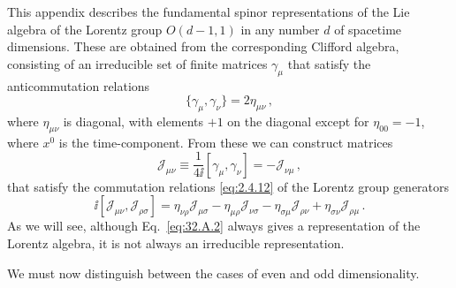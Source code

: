 

This appendix describes the fundamental spinor representations of the Lie
algebra of the Lorentz group \(O(d-1,1)\) in any number \(d\) of spacetime
dimensions. These are obtained from the corresponding Clifford algebra,
consisting of an irreducible set of finite matrices \(\gamma_\mu\) that
satisfy the anticommutation relations
\begin{equation}
  \{\gamma_\mu,\gamma_\nu\}=2\eta_{\mu\nu}\,,
  \tag{32.A.1}\label{eq:32.A.1}
\end{equation}
where \(\eta_{\mu\nu}\) is diagonal, with elements \(+1\) on the diagonal
except for \(\eta_{00}=-1\), where \(x^0\) is the time-component. From these
we can construct matrices
\begin{equation}
  \mathcal J_{\mu\nu}
  \equiv\frac{1}{4\ii}[\gamma_\mu,\gamma_\nu]
  =-\mathcal J_{\nu\mu}\,,
  \tag{32.A.2}\label{eq:32.A.2}
\end{equation}
that satisfy the commutation relations \eqref{eq:2.4.12} of the Lorentz
group generators
\begin{equation}
  \ii[\mathcal J_{\mu\nu},\mathcal J_{\rho\sigma}]
  =\eta_{\nu\rho}\mathcal J_{\mu\sigma}
   -\eta_{\mu\rho}\mathcal J_{\nu\sigma}
   -\eta_{\sigma\mu}\mathcal J_{\rho\nu}
   +\eta_{\sigma\nu}\mathcal J_{\rho\mu}\,.
  \tag{32.A.3}\label{eq:32.A.3}
\end{equation}
As we will see, although Eq.~\eqref{eq:32.A.2} always gives a representation
of the Lorentz algebra, it is not always an irreducible representation.

We must now distinguish between the cases of even and odd dimensionality.

